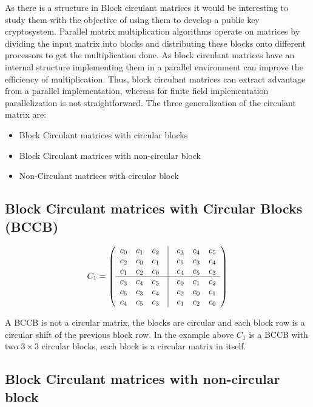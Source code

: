 As there is a structure in Block circulant matrices it would be interesting to study them with the objective of using them to 
develop a public key cryptosystem.
Parallel matrix multiplication algorithms operate on matrices by dividing the input matrix into blocks and distributing these blocks onto 
different processors to get the multiplication done.
As block circulant matrices have an internal structure implementing them in a parallel environment can improve the efficiency of multiplication.
Thus, block circulant matrices can extract advantage from a parallel implementation, whereas for finite field implementation parallelization
is not straightforward.
The three generalization of the circulant matrix are:
\begin{itemize}
  \item Block Circulant matrices with circular blocks
  \item Block Circulant matrices with non-circular block
  \item Non-Circulant matrices with circular block
\end{itemize}

\subsection{Block Circulant matrices with Circular Blocks (BCCB)}

\[ C_{1} =\left( \begin{array}{ccccccc}
c_{0} & c_{1} &c_{2} & \vline & c_{3} & c_{4} &c_{5}    \\
c_{2} & c_{0} &c_{1} & \vline & c_{5} & c_{3} &c_{4}    \\
c_{1} & c_{2} &c_{0} & \vline & c_{4} & c_{5} &c_{3}    \\
\hline
c_{3} & c_{4} &c_{5} & \vline & c_{0} & c_{1} &c_{2}    \\
c_{5} & c_{3} &c_{4} & \vline & c_{2} & c_{0} &c_{1}    \\
c_{4} & c_{5} &c_{3} & \vline & c_{1} & c_{2} &c_{0}    \\
\end{array} \right)\]

A BCCB is not a circular matrix, the blocks are circular and each block row is a circular shift of the previous block row. 
In the example above $C_{1}$ is a BCCB with two $3 \times 3$ circular blocks, each block is a circular matrix in itself. 

\subsection{Block Circulant matrices with non-circular block}

